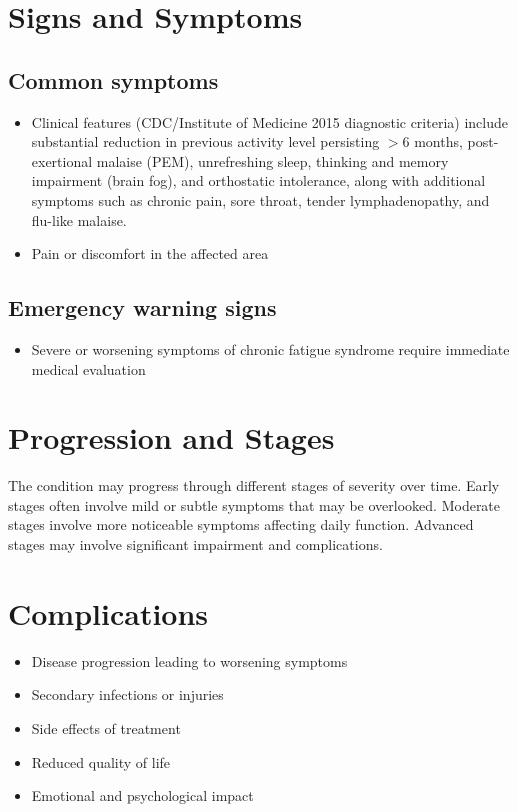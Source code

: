\section{Signs and Symptoms}

\subsection{Common symptoms}
\begin{itemize}[noitemsep]
  \item Clinical features (CDC/Institute of Medicine 2015 diagnostic criteria) include substantial reduction in previous activity level persisting $>$6 months, post-exertional malaise (PEM), unrefreshing sleep, thinking and memory impairment (brain fog), and orthostatic intolerance, along with additional symptoms such as chronic pain, sore throat, tender lymphadenopathy, and flu-like malaise.
  \item Pain or discomfort in the affected area
  \end{itemize}

\subsection{Emergency warning signs}
\begin{itemize}[noitemsep]
  \item Severe or worsening symptoms of chronic fatigue syndrome require immediate medical evaluation
\end{itemize}
\section{Progression and Stages}
The condition may progress through different stages of severity over time. Early stages often involve mild or subtle symptoms that may be overlooked. Moderate stages involve more noticeable symptoms affecting daily function. Advanced stages may involve significant impairment and complications.
\section{Complications}
\begin{itemize}[noitemsep]
  \item Disease progression leading to worsening symptoms
  \item Secondary infections or injuries
  \item Side effects of treatment
  \item Reduced quality of life
  \item Emotional and psychological impact
\end{itemize}
